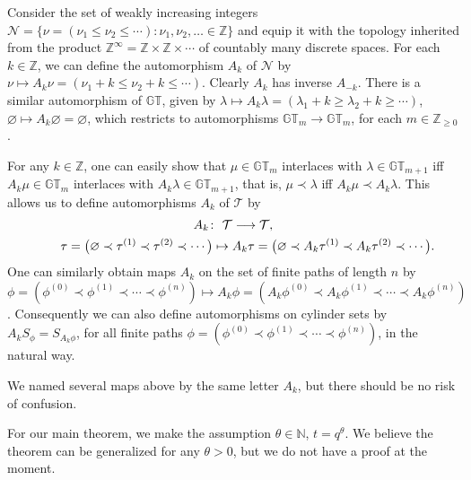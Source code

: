 \documentclass[pdftex]{sigma}
\numberwithin{equation}{section}
\newcommand{\Z}{\mathbb{Z}}
\newcommand{\N}{\mathbb{N}}
\newcommand{\Nu}{\mathcal{N}}
\newcommand{\GT}{\mathbb{GT}}
\newcommand{\Tau}{\mathcal{T}}
\begin{document}
Consider the set of weakly increasing integers $\Nu = \{\nu = (\nu_1 \leq \nu_2 \leq \cdots)\colon \nu_1, \nu_2, \dots \in\Z\}$ and equip it with the topology inherited from the product $\Z^{\infty} = \Z\times\Z\times\cdots$ of countably many discrete spaces. For each $k\in\Z$, we can def\/ine the automorphism $A_k$ of $\Nu$ by $\nu \mapsto A_k\nu = (\nu_1 + k \leq \nu_2 + k \leq \cdots)$. Clearly $A_k$ has inverse $A_{-k}$. There is a similar automorphism of $\GT$, given by $\lambda \mapsto A_k\lambda = (\lambda_1 + k \geq \lambda_2 + k \geq \cdots)$, $\varnothing \mapsto A_k\varnothing = \varnothing$, which restricts to automorphisms $\GT_m \rightarrow \GT_m$, for each $m\in\Z_{\geq 0}$.

For any $k\in\Z$, one can easily show that $\mu\in\GT_m$ interlaces with $\lambda\in\GT_{m+1}$ if\/f $A_k\mu\in\GT_m$ interlaces with $A_k\lambda\in\GT_{m+1}$, that is, $\mu\prec\lambda$ if\/f $A_k\mu\prec A_k\lambda$.
This allows us to def\/ine automorphisms $A_k$ of $\Tau$ by
\begin{gather*}
A_k\colon \ \Tau \longrightarrow \Tau,\\
\hphantom{A_k\colon}{} \ \tau = \big(\varnothing \prec \tau^{(1)} \prec \tau^{(2)} \prec \cdots\big) \mapsto A_k\tau = \big(\varnothing \prec A_k\tau^{(1)} \prec A_k\tau^{(2)} \prec \cdots\big).
\end{gather*}
One can similarly obtain maps $A_k$ on the set of f\/inite paths of length $n$ by $\phi = (\phi^{(0)} \prec \phi^{(1)} \prec \cdots \prec \phi^{(n)}) \mapsto A_k\phi = (A_k\phi^{(0)} \prec A_k\phi^{(1)}\prec \cdots\prec A_k\phi^{(n)})$. Consequently we can also def\/ine automorphisms on cylinder sets by $A_k S_{\phi} = S_{A_k\phi}$, for all f\/inite paths $\phi = (\phi^{(0)} \prec \phi^{(1)} \prec \cdots \prec \phi^{(n)})$, in the natural way.

We named several maps above by the same letter $A_k$, but there should be no risk of confusion.

For our main theorem, we make the assumption $\theta\in\N$, $t = q^{\theta}$. We believe the theorem can be generalized for any $\theta>0$, but we do not have a proof at the moment.
\end{document}

